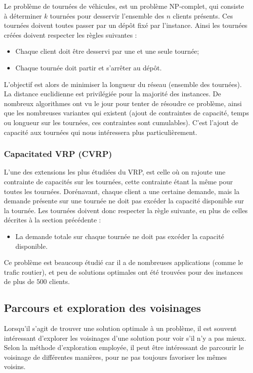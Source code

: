 \documentclass[a4paper,11pt]{article}%
\begin{document}
Le problème de tournées de véhicules, est un problème NP-complet, qui consiste à déterminer $k$ tournées pour desservir l'ensemble des $n$ clients présents.  Ces tournées doivent toutes passer par un dépôt fixé par l'instance. 
Ainsi les tournées créées doivent respecter les règles suivantes :
\begin{itemize}
\item Chaque client doit être desservi par une et une seule tournée;
\item Chaque tournée doit partir et s'arrêter au dépôt.
\end{itemize}
L'objectif est alors de minimiser la longueur du réseau (ensemble des tournées). La distance euclidienne est privilégiée pour la majorité des instances.
De nombreux algorithmes ont vu le jour pour tenter de résoudre ce problème, ainsi que les nombreuses variantes qui existent (ajout de contraintes de capacité, temps ou longueur sur les tournées, ces contraintes sont cumulables). 
C'est l'ajout de capacité aux tournées qui nous intéressera plus particulièrement.

\subsubsection{Capacitated VRP (CVRP)}

L'une des extensions les plus étudiées du VRP, est celle où on rajoute une contrainte de capacités sur les tournées, cette contrainte étant la même pour toutes les tournées. 
Dorénavant, chaque client a une certaine demande, mais la demande présente sur une tournée ne doit pas excéder la capacité disponible sur la tournée.
Les tournées doivent donc respecter la règle suivante, en plus de celles décrites à la section précédente :
\begin{itemize}
\item La demande totale sur chaque tournée ne doit pas excéder la capacité disponible.
\end{itemize}
Ce problème est beaucoup étudié car il a de nombreuses applications (comme le trafic routier), et peu de solutions optimales ont été trouvées pour des instances de plus de $500$ clients. 


\subsection{Parcours et exploration des voisinages}
\label{voisinage}

Lorsqu'il s'agit de trouver une solution optimale à un problème, il est souvent intéressant d'explorer les voisinages d'une solution pour voir s'il n'y a pas mieux. Selon la méthode d'exploration employée, il peut être intéressant de parcourir le voisinage de différentes manières, pour ne pas toujours favoriser les mêmes voisins.
\end{document}
